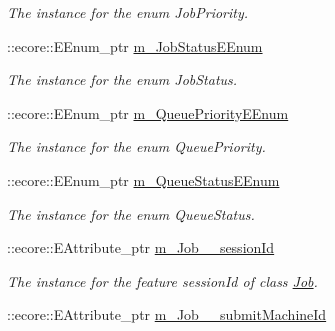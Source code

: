 \begin{DoxyCompactItemize}
\begin{DoxyCompactList}\small\item\em The instance for the enum JobPriority. \item\end{DoxyCompactList}\item 
\hypertarget{classTMS__Data_1_1TMS__DataPackage_a47e52fdf0df1eb86d1b03ff8cbae9956}{
::ecore::EEnum\_\-ptr \hyperlink{classTMS__Data_1_1TMS__DataPackage_a47e52fdf0df1eb86d1b03ff8cbae9956}{m\_\-JobStatusEEnum}}
\label{classTMS__Data_1_1TMS__DataPackage_a47e52fdf0df1eb86d1b03ff8cbae9956}

\begin{DoxyCompactList}\small\item\em The instance for the enum JobStatus. \item\end{DoxyCompactList}\item 
\hypertarget{classTMS__Data_1_1TMS__DataPackage_af026eb903935dbbedc85c86c24fded48}{
::ecore::EEnum\_\-ptr \hyperlink{classTMS__Data_1_1TMS__DataPackage_af026eb903935dbbedc85c86c24fded48}{m\_\-QueuePriorityEEnum}}
\label{classTMS__Data_1_1TMS__DataPackage_af026eb903935dbbedc85c86c24fded48}

\begin{DoxyCompactList}\small\item\em The instance for the enum QueuePriority. \item\end{DoxyCompactList}\item 
\hypertarget{classTMS__Data_1_1TMS__DataPackage_a6ce001656156aa9f6273becf625913b1}{
::ecore::EEnum\_\-ptr \hyperlink{classTMS__Data_1_1TMS__DataPackage_a6ce001656156aa9f6273becf625913b1}{m\_\-QueueStatusEEnum}}
\label{classTMS__Data_1_1TMS__DataPackage_a6ce001656156aa9f6273becf625913b1}

\begin{DoxyCompactList}\small\item\em The instance for the enum QueueStatus. \item\end{DoxyCompactList}\item 
\hypertarget{classTMS__Data_1_1TMS__DataPackage_acb5bf229c347ab326fc3825145aa7880}{
::ecore::EAttribute\_\-ptr \hyperlink{classTMS__Data_1_1TMS__DataPackage_acb5bf229c347ab326fc3825145aa7880}{m\_\-Job\_\-\_\-sessionId}}
\label{classTMS__Data_1_1TMS__DataPackage_acb5bf229c347ab326fc3825145aa7880}

\begin{DoxyCompactList}\small\item\em The instance for the feature sessionId of class \hyperlink{classTMS__Data_1_1Job}{Job}. \item\end{DoxyCompactList}\item 
\hypertarget{classTMS__Data_1_1TMS__DataPackage_ae88154ea0caeec4cd7087159802a4f37}{
::ecore::EAttribute\_\-ptr \hyperlink{classTMS__Data_1_1TMS__DataPackage_ae88154ea0caeec4cd7087159802a4f37}{m\_\-Job\_\-\_\-submitMachineId}}
\label{classTMS__Data_1_1TMS__DataPackage_ae88154ea0caeec4cd7087159802a4f37}


\end{DoxyCompactItemize}

